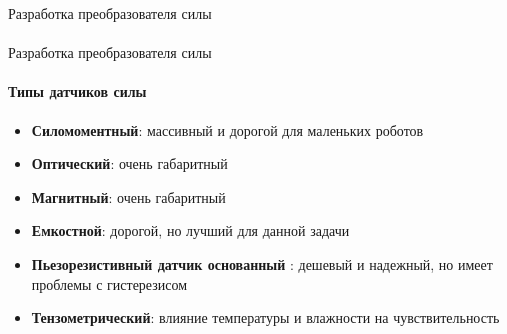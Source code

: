 \documentclass[aspectratio=169,xcolor=table]{beamer}
\begin{document}
\begin{frame}[t]{Разработка преобразователя силы}
    \framesubtitle{}
\end{frame}

\begin{frame}[t]{Разработка преобразователя силы}
    \framesubtitle{Типы датчиков силы}
    \vspace{-20pt}
    \begin{multicols}{2}
        \begin{itemize}
            \item  \textbf{Силомоментный}: массивный и дорогой для маленьких роботов
            \item \textbf{Оптический}: очень габаритный
            \item \textbf{Магнитный}: очень габаритный
            \item \textbf{Емкостной}: дорогой, но лучший для данной задачи
            \item {\color{black}\textbf{Пьезорезистивный датчик основанный }: дешевый и надежный, но имеет проблемы с гистерезисом}

            \item {  \textbf{Тензометрический}: влияние температуры и влажности на чувствительность}
        \end{itemize}
    \end{multicols}
    \vspace{-10pt}
\end{frame}
\end{document}
